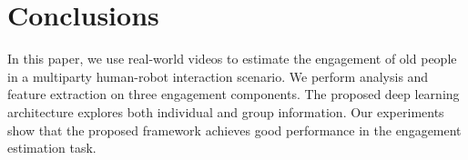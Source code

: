\documentclass[twocolumn]{svjour3}
\begin{document}
\section{Conclusions}
\label{s:Conclusions}

In this paper, we use real-world videos to estimate the engagement of old people in a multiparty human-robot interaction scenario. We perform analysis and feature extraction on three engagement components. The proposed deep learning architecture explores both individual and group information. Our experiments show that the proposed framework achieves good performance in the engagement estimation task.




\end{document}
